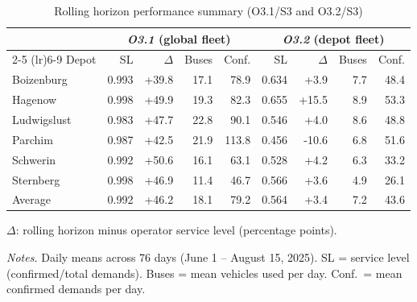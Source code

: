 \begin{table}[ht]
\centering
\caption{Rolling horizon performance summary (O3.1/S3 and O3.2/S3)}
\label{tab:rh_summary}
\begin{threeparttable}
\begin{tabular}{l rrrr rrrr}
\toprule
& \multicolumn{4}{c}{\textit{O3.1} (global fleet)} & \multicolumn{4}{c}{\textit{O3.2} (depot fleet)} \\
\cmidrule(lr){2-5} \cmidrule(lr){6-9}
Depot & SL & $\Delta$\tnote{a} & Buses & Conf. & SL & $\Delta$\tnote{a} & Buses & Conf. \\
\midrule
Boizenburg & 0.993 & +39.8 & 17.1 & 78.9 & 0.634 & +3.9 & 7.7 & 48.4 \\
Hagenow & 0.998 & +49.9 & 19.3 & 82.3 & 0.655 & +15.5 & 8.9 & 53.3 \\
Ludwigslust & 0.983 & +47.7 & 22.8 & 90.1 & 0.546 & +4.0 & 8.6 & 48.8 \\
Parchim & 0.987 & +42.5 & 21.9 & 113.8 & 0.456 & -10.6 & 6.8 & 51.6 \\
Schwerin & 0.992 & +50.6 & 16.1 & 63.1 & 0.528 & +4.2 & 6.3 & 33.2 \\
Sternberg & 0.998 & +46.9 & 11.4 & 46.7 & 0.566 & +3.6 & 4.9 & 26.1 \\
\midrule
Average & 0.992 & +46.2 & 18.1 & 79.2 & 0.564 & +3.4 & 7.2 & 43.6 \\
\bottomrule
\end{tabular}
\begin{tablenotes}
\smaller
\item[a] $\Delta$: rolling horizon minus operator service level (percentage points).
\item \textit{Notes.} Daily means across 76 days (June 1 -- August 15, 2025).
SL = service level (confirmed/total demands).
Buses = mean vehicles used per day.
Conf.\ = mean confirmed demands per day.
\end{tablenotes}
\end{threeparttable}
\end{table}
